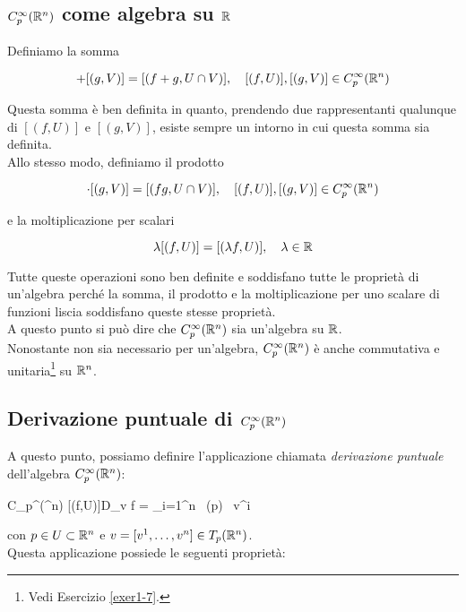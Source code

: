 \subsection{$ C_{p}^{\infty}(\mathbb{R}^{n}) $ come algebra su $ \mathbb{R} $}

Definiamo la somma

\begin{equation}
	[(f,U)] + [(g,V)] = [(f + g,U \cap V)] \qcomma [(f,U)], [(g,V)] \in C_{p}^{\infty}(\R^{n})
\end{equation}

Questa somma è ben definita in quanto, prendendo due rappresentanti qualunque di $ [(f,U)] $ e $ [(g,V)] $, esiste sempre un intorno in cui questa somma sia definita. \\
Allo stesso modo, definiamo il prodotto

\begin{equation}
	[(f,U)] \cdot [(g,V)] = [(f g,U \cap V)] \qcomma [(f,U)], [(g,V)] \in C_{p}^{\infty}(\R^{n})
\end{equation}

e la moltiplicazione per scalari

\begin{equation}
	\lambda [(f,U)] = [(\lambda f,U)] \qcomma \lambda \in \R
\end{equation}

Tutte queste operazioni sono ben definite e soddisfano tutte le proprietà di un'algebra perché la somma, il prodotto e la moltiplicazione per uno scalare di funzioni liscia soddisfano queste stesse proprietà. \\
A questo punto si può dire che $ C_{p}^{\infty}(\mathbb{R}^{n}) $ sia un'algebra su $ \mathbb{R} $. \\
Nonostante non sia necessario per un'algebra, $ C_{p}^{\infty}(\mathbb{R}^{n}) $ è anche commutativa e unitaria\footnote{%
	Vedi Esercizio \ref{exer1-7}.%
} su $ \mathbb{R}^{n} $.

\subsection{Derivazione puntuale di $ C_{p}^{\infty}(\mathbb{R}^{n}) $}

A questo punto, possiamo definire l'applicazione chiamata \textit{derivazione puntuale} dell'algebra $ C_{p}^{\infty}(\mathbb{R}^{n}) $:

	{C_{p}^{\infty}(\R^{n})}{\R}
	{[(f,U)]}{D_{v} f = \sum_{i=1}^{n}  \, (p) \, v^{i}}

con $ p \in U \subset \mathbb{R}^{n} $ e $ v = [v^{1}, \dots, v^{n}] \in T_{p} (\mathbb{R}^{n}) $. \\
Questa applicazione possiede le seguenti proprietà:

